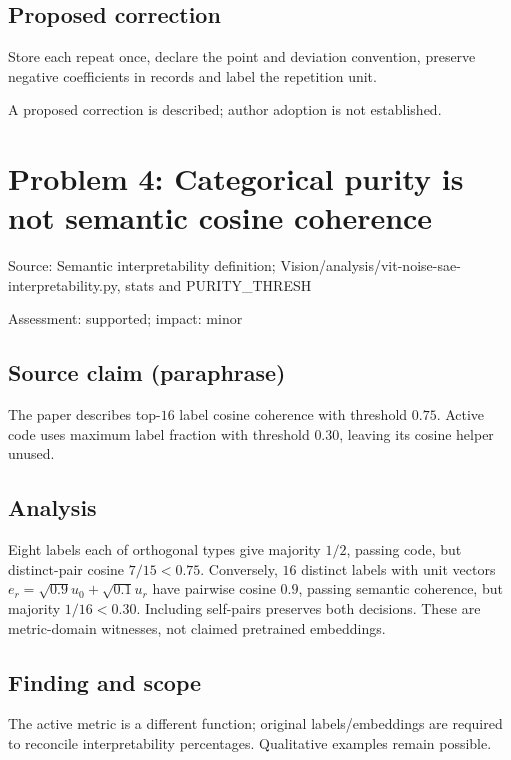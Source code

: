 \documentclass[11pt]{article}
\begin{document}
\subsection*{Proposed correction}

Store each repeat once, declare the point and deviation convention, preserve negative coefficients in records and label the repetition unit.

A proposed correction is described; author adoption is not established.

\section*{Problem 4: Categorical purity is not semantic cosine coherence}

Source: Semantic interpretability definition; Vision/analysis/vit-noise-sae-interpretability.py, stats and PURITY\_THRESH

Assessment: supported; impact: minor

\subsection*{Source claim (paraphrase)}

The paper describes top-\(16\) label cosine coherence with threshold \(0.75\). Active code uses maximum label fraction with threshold \(0.30\), leaving its cosine helper unused.

\subsection*{Analysis}

Eight labels each of orthogonal types give majority \(1/2\), passing code, but distinct-pair cosine \(7/15<0.75\). Conversely, \(16\) distinct labels with unit vectors \(e_r=\sqrt{0.9}u_0+\sqrt{0.1}u_r\) have pairwise cosine \(0.9\), passing semantic coherence, but majority \(1/16<0.30\). Including self-pairs preserves both decisions. These are metric-domain witnesses, not claimed pretrained embeddings.

\subsection*{Finding and scope}

The active metric is a different function; original labels/embeddings are required to reconcile interpretability percentages. Qualitative examples remain possible.
\end{document}
